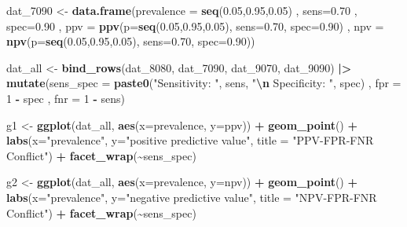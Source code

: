 \documentclass[12pt, twoside]{amherstthesis}
\newenvironment{Shaded}{\begin{snugshade}}{\end{snugshade}}
\newcommand{\AttributeTok}[1]{\textcolor[rgb]{0.13,0.29,0.53}{#1}}
\newcommand{\DecValTok}[1]{\textcolor[rgb]{0.00,0.00,0.81}{#1}}
\newcommand{\FloatTok}[1]{\textcolor[rgb]{0.00,0.00,0.81}{#1}}
\newcommand{\FunctionTok}[1]{\textcolor[rgb]{0.13,0.29,0.53}{\textbf{#1}}}
\newcommand{\NormalTok}[1]{#1}
\newcommand{\OtherTok}[1]{\textcolor[rgb]{0.56,0.35,0.01}{#1}}
\newcommand{\SpecialCharTok}[1]{\textcolor[rgb]{0.81,0.36,0.00}{\textbf{#1}}}
\newcommand{\StringTok}[1]{\textcolor[rgb]{0.31,0.60,0.02}{#1}}
\begin{document}
\begin{Shaded}
\begin{Highlighting}[]
\NormalTok{dat\_7090 }\OtherTok{\textless{}{-}} \FunctionTok{data.frame}\NormalTok{(}\AttributeTok{prevalence =} \FunctionTok{seq}\NormalTok{(}\FloatTok{0.05}\NormalTok{,}\FloatTok{0.95}\NormalTok{,}\FloatTok{0.05}\NormalTok{)}
\NormalTok{                       , }\AttributeTok{sens=}\FloatTok{0.70}
\NormalTok{                       , }\AttributeTok{spec=}\FloatTok{0.90}
\NormalTok{                       , }\AttributeTok{ppv =} \FunctionTok{ppv}\NormalTok{(}\AttributeTok{p=}\FunctionTok{seq}\NormalTok{(}\FloatTok{0.05}\NormalTok{,}\FloatTok{0.95}\NormalTok{,}\FloatTok{0.05}\NormalTok{), }
                                   \AttributeTok{sens=}\FloatTok{0.70}\NormalTok{, }
                                   \AttributeTok{spec=}\FloatTok{0.90}\NormalTok{)}
\NormalTok{                       , }\AttributeTok{npv =} \FunctionTok{npv}\NormalTok{(}\AttributeTok{p=}\FunctionTok{seq}\NormalTok{(}\FloatTok{0.05}\NormalTok{,}\FloatTok{0.95}\NormalTok{,}\FloatTok{0.05}\NormalTok{), }
                                   \AttributeTok{sens=}\FloatTok{0.70}\NormalTok{, }
                                   \AttributeTok{spec=}\FloatTok{0.90}\NormalTok{))}

\NormalTok{dat\_all }\OtherTok{\textless{}{-}} \FunctionTok{bind\_rows}\NormalTok{(dat\_8080, dat\_7090, dat\_9070, dat\_9090) }\SpecialCharTok{|\textgreater{}}
  \FunctionTok{mutate}\NormalTok{(}\AttributeTok{sens\_spec =} \FunctionTok{paste0}\NormalTok{(}\StringTok{"Sensitivity: "}\NormalTok{, sens, }
                            \StringTok{"}\SpecialCharTok{\textbackslash{}n}\StringTok{ Specificity: "}\NormalTok{, spec)}
\NormalTok{         , }\AttributeTok{fpr =} \DecValTok{1} \SpecialCharTok{{-}}\NormalTok{ spec}
\NormalTok{         , }\AttributeTok{fnr =} \DecValTok{1} \SpecialCharTok{{-}}\NormalTok{ sens)}

\NormalTok{g1 }\OtherTok{\textless{}{-}} \FunctionTok{ggplot}\NormalTok{(dat\_all, }\FunctionTok{aes}\NormalTok{(}\AttributeTok{x=}\NormalTok{prevalence, }\AttributeTok{y=}\NormalTok{ppv)) }\SpecialCharTok{+}
        \FunctionTok{geom\_point}\NormalTok{() }\SpecialCharTok{+} 
        \FunctionTok{labs}\NormalTok{(}\AttributeTok{x=}\StringTok{"prevalence"}\NormalTok{, }\AttributeTok{y=}\StringTok{"positive predictive value"}\NormalTok{,}
             \AttributeTok{title =} \StringTok{"PPV{-}FPR{-}FNR Conflict"}\NormalTok{) }\SpecialCharTok{+}
        \FunctionTok{facet\_wrap}\NormalTok{(}\SpecialCharTok{\textasciitilde{}}\NormalTok{sens\_spec)}

\NormalTok{g2 }\OtherTok{\textless{}{-}} \FunctionTok{ggplot}\NormalTok{(dat\_all, }\FunctionTok{aes}\NormalTok{(}\AttributeTok{x=}\NormalTok{prevalence, }\AttributeTok{y=}\NormalTok{npv)) }\SpecialCharTok{+}
        \FunctionTok{geom\_point}\NormalTok{() }\SpecialCharTok{+} 
        \FunctionTok{labs}\NormalTok{(}\AttributeTok{x=}\StringTok{"prevalence"}\NormalTok{, }\AttributeTok{y=}\StringTok{"negative predictive value"}\NormalTok{,}
             \AttributeTok{title =} \StringTok{"NPV{-}FPR{-}FNR Conflict"}\NormalTok{) }\SpecialCharTok{+}
        \FunctionTok{facet\_wrap}\NormalTok{(}\SpecialCharTok{\textasciitilde{}}\NormalTok{sens\_spec)}


\end{Highlighting}
\end{Shaded}
\end{document}
